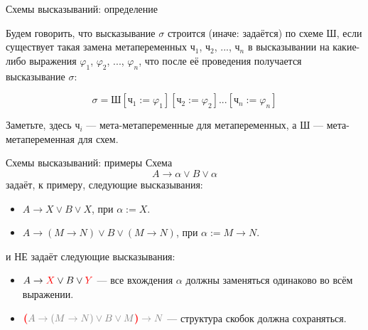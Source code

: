 \documentclass[aspectratio=169]{beamer}
\begin{document}
\begin{frame}{Схемы высказываний: определение}

\begin{defrus}Будем говорить, что высказывание $\sigma$ строится (иначе: задаётся) по схеме $\textit{Ш}$, 
если существует такая замена метапеременных $\textit{ч}_1$, $\textit{ч}_2$, ..., $\textit{ч}_n$ 
в высказывании на какие-либо выражения $\varphi_1$, $\varphi_2$, ..., $\varphi_n$, 
что после её проведения получается высказывание $\sigma$:

$$\sigma = \textit{Ш}[\textit{ч}_1 := \varphi_1][\textit{ч}_2 := \varphi_2]...[\textit{ч}_n := \varphi_n]$$

Заметьте, здесь $\textit{ч}_i$ --- мета-метапеременные для метапеременных, а $\textit{Ш}$ --- мета-метапеременная для схем.
\end{defrus}
\end{frame}

\begin{frame}{Схемы высказываний: примеры}
Схема $$A \rightarrow \alpha \vee B \vee \alpha$$ задаёт, к примеру, следующие высказывания:
\begin{itemize}
\item $A \rightarrow X \vee B \vee X$, при $\alpha := X$.
\item $A \rightarrow (M\rightarrow N) \vee B \vee (M \rightarrow N)$, при $\alpha := M\rightarrow N$.
\end{itemize}

\vspace{0.5cm}\pause

и {\color{red} НЕ} задаёт следующие высказывания:
\begin{itemize}
\item {\color{red} $A \rightarrow {\color{red}X} \vee B \vee {\color{red}Y}$} --- все вхождения $\alpha$ должны заменяться одинаково во всём выражении.
\item { ${\color{red}\textbf{(}}{\color{gray}A \rightarrow (M \rightarrow N) \vee B \vee M}{\color{red}\textbf{)}} \color{gray}\rightarrow N$} --- структура скобок должна сохраняться.
\end{itemize}

\end{frame}

%
%
%
%
%
%
\end{document}
